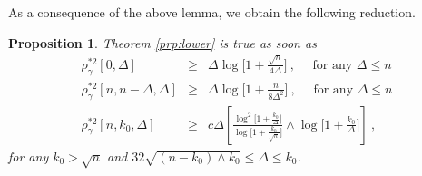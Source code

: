 \documentclass[twoside,11pt]{article}
\newtheorem{prp}{Proposition}
\newcommand{\<}{\langle}
\renewcommand{\>}{\rangle}
\begin{document}
As a consequence of the above lemma, we obtain the following reduction. 
\begin{prp}\label{prp:lower_reduced}
Theorem \ref{prp:lower} is true as soon as 
\begin{eqnarray}\label{eq:lower_bound_main_simple}
 \rho_{\gamma}^{*2}[0,\Delta]& \geq& \Delta \log\Big[1+ \frac{ \sqrt{n}}{4\Delta} \Big]\ ,\quad \text{ for any }\Delta\leq n\\
 \rho_{\gamma}^{*2}[n,n-\Delta,\Delta]& \geq& \Delta \log\Big[1  + \frac{n}{8\Delta^2}\Big]\ ,\quad \text{ for any }\Delta\leq n \label{eq:lower_bound_main3_simple} \\
 \rho_{\gamma}^{*2}[n,k_0,\Delta] &\geq& c\Delta \left[\frac{\log^2\big[1+  \frac{k_0}{\Delta}\big]}{\log\big[1+ \frac{k_0}{\sqrt{n}}\big]}\wedge \log\big[1+ \frac{k_0}{\Delta}\big]\right]\ ,
  \label{eq:lower_bound_main2_simple} 
\end{eqnarray}
 for any $k_0>\sqrt{n}$ and  $32\sqrt{(n-k_0)\wedge  k_0}\leq \Delta\leq k_0$.

\end{prp}
\end{document}
